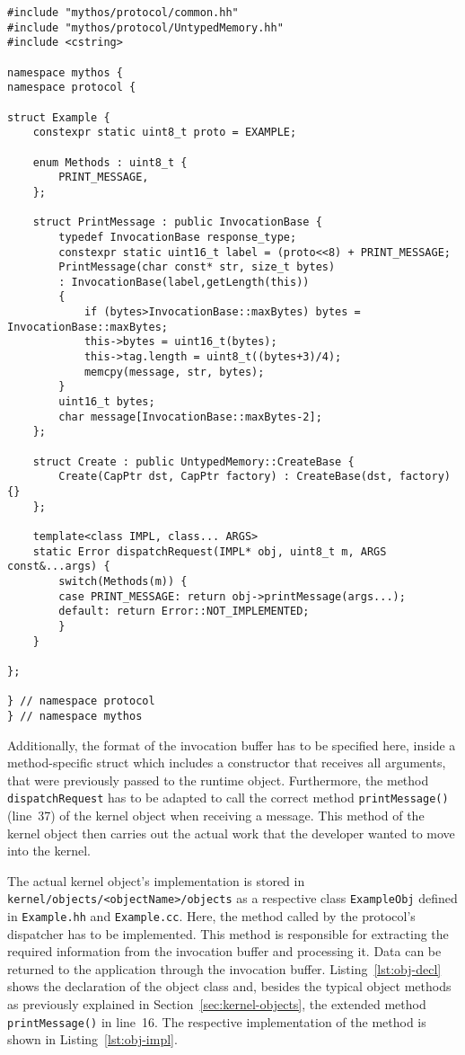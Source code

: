 \lstset{language=c++,caption=Object's Protocol Definition,label=lst:obj-protocol}
\begin{lstlisting}
#include "mythos/protocol/common.hh"
#include "mythos/protocol/UntypedMemory.hh"
#include <cstring>

namespace mythos {
namespace protocol {

struct Example {
	constexpr static uint8_t proto = EXAMPLE;

	enum Methods : uint8_t {
		PRINT_MESSAGE,
	};

	struct PrintMessage : public InvocationBase {
		typedef InvocationBase response_type;
		constexpr static uint16_t label = (proto<<8) + PRINT_MESSAGE;
		PrintMessage(char const* str, size_t bytes)
		: InvocationBase(label,getLength(this))
		{
			if (bytes>InvocationBase::maxBytes) bytes = InvocationBase::maxBytes;
			this->bytes = uint16_t(bytes);
			this->tag.length = uint8_t((bytes+3)/4);
			memcpy(message, str, bytes);
		}
		uint16_t bytes;
		char message[InvocationBase::maxBytes-2];
	};

	struct Create : public UntypedMemory::CreateBase {
		Create(CapPtr dst, CapPtr factory) : CreateBase(dst, factory) {}
	};

	template<class IMPL, class... ARGS>
	static Error dispatchRequest(IMPL* obj, uint8_t m, ARGS const&...args) {
		switch(Methods(m)) {
		case PRINT_MESSAGE: return obj->printMessage(args...);
		default: return Error::NOT_IMPLEMENTED;
		}
	}

};

} // namespace protocol
} // namespace mythos
\end{lstlisting}

Additionally, the format of the invocation buffer has to be specified here,
inside a method-specific struct which includes a constructor that receives all
arguments, that were previously passed to the runtime object.  Furthermore, the
method \texttt{dispatchRequest} has to be adapted to call the correct method
\texttt{printMessage()} (line~37) of the kernel object when receiving a message.
This method of the kernel object then carries out the actual work that the
developer wanted to move into the kernel.

The actual kernel object's implementation is stored in
\\\texttt{kernel/objects/<objectName>/objects} as a respective class
\texttt{ExampleObj} defined in \texttt{Example.hh} and \texttt{Example.cc}.
Here, the method called by the protocol's dispatcher has to be implemented. This
method is responsible for extracting the required information from the
invocation buffer and processing it. Data can be returned to the application
through the invocation buffer. Listing~\ref{lst:obj-decl} shows the declaration
of the object class and, besides the typical object methods as previously
explained in Section~\ref{sec:kernel-objects}, the extended method
\texttt{printMessage()} in line~16. The respective implementation of the method
is shown in Listing~\ref{lst:obj-impl}. \\


